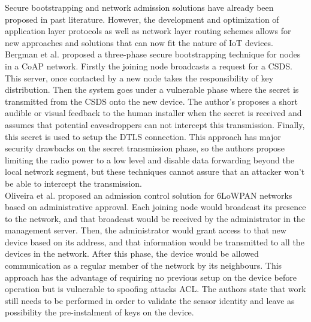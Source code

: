 \documentclass{sig-alternate-05-2015}
\begin{document}
Secure bootstrapping and network admission solutions have already been proposed in past literature. However, the development and optimization of application layer protocols as well as network layer routing schemes allows for new approaches and solutions that can now fit the nature of \gls{IoT} devices.
Bergman et al.\cite{Bergmann2012} proposed a three-phase secure bootstrapping technique for nodes in a \gls{CoAP} network. Firstly the joining node broadcasts a request for a \gls{CSDS}. This server, once contacted by a new node takes the responsibility of key distribution. Then the system goes under a vulnerable phase where the secret is transmitted from the \gls{CSDS} onto the new device. The author's proposes a short audible or visual feedback to the human installer when the secret is received and assumes that potential eavesdroppers can not intercept this transmission. Finally, this secret is used to setup the \gls{DTLS} connection. This approach has major security drawbacks on the secret transmission phase, so the authors propose limiting the radio power to a low level and disable data forwarding beyond the local network segment, but these techniques cannot assure that an attacker won't be able to intercept the transmission.\\
Oliveira et al. \cite{Oliveira2013} proposed an admission control solution for 6LoWPAN networks based on administrative approval. Each joining node would broadcast its presence to the network, and that broadcast would be received by the administrator in the management server. Then, the administrator would grant access to that new device based on its address, and that information would be transmitted to all the devices in the network. After this phase, the device would be allowed communication as a regular member of the network by its neighbours. This approach has the advantage of requiring no previous setup on the device before operation but is vulnerable to spoofing attacks \gls{ACL}. The authors state that work still needs to be performed in order to validate the sensor identity and leave as possibility the pre-instalment of keys on the device. 
\end{document}

